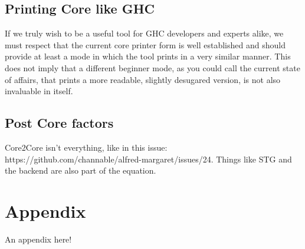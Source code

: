 \documentclass{report}
\begin{document}
\section{Printing Core like GHC}
If we truly wish to be a useful tool for GHC developers and experts alike, we must respect
that the current core printer form is well established and should provide at least a mode in which
the tool prints in a very similar manner. This does not imply that a different beginner mode, as you
could call the current state of affairs, that prints a more readable, slightly desugared version, 
is not also invaluable in itself.
\section{Post Core factors}
Core2Core isn't everything, like in this issue: https://github.com/channable/alfred-margaret/issues/24.
Things like STG and the backend are also part of the equation.




\appendix
\clearpage
{}
\chapter{Appendix}
An appendix here!
\end{document}

